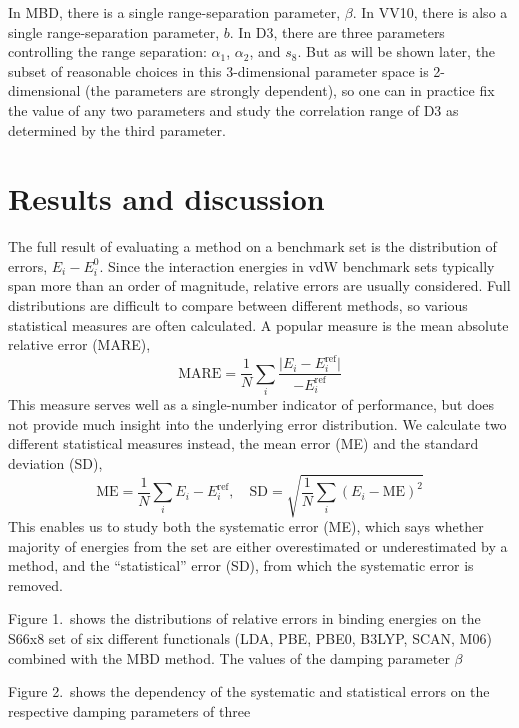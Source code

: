In MBD, there is a single range-separation parameter, $\beta$.
In VV10, there is also a single range-separation parameter, $b$.
In D3, there are three parameters controlling the range separation: $\alpha_1$, $\alpha_2$, and $s_8$.
But as will be shown later, the subset of reasonable choices in this 3-dimensional parameter space is 2-dimensional (the parameters are strongly dependent), so one can in practice fix the value of any two parameters and study the correlation range of D3 as determined by the third parameter.

\section{Results and discussion}

The full result of evaluating a method on a benchmark set is the distribution of errors, ${E_i-E_i^0}$.
Since the interaction energies in vdW benchmark sets typically span more than an order of magnitude, relative errors are usually considered.
Full distributions are difficult to compare between different methods, so various statistical measures are often calculated.
A popular measure is the mean absolute relative error (MARE),
$$
\text{MARE}=\frac1N\sum_i\frac{\lvert E_i-E_i^\text{ref}\rvert}{-E_i^\text{ref}}
$$
This measure serves well as a single-number indicator of performance, but does not provide much insight into the underlying error distribution.
We calculate two different statistical measures instead, the mean error (ME) and the standard deviation (SD),
$$
\text{ME}=\frac1N\sum_i E_i-E_i^\text{ref},\quad
\text{SD}=\sqrt{\frac1N\sum_i(E_i-\text{ME})^2}
$$
This enables us to study both the systematic error (ME), which says whether majority of energies from the set are either overestimated or underestimated by a method, and the ``statistical'' error (SD), from which the systematic error is removed.

Figure 1.\ shows the distributions of relative errors in binding energies on the S66x8 set of six different functionals (LDA, PBE, PBE0, B3LYP, SCAN, M06) combined with the MBD method.
The values of the damping parameter $\beta$ 

Figure 2.\ shows the dependency of the systematic and statistical errors on the respective damping parameters of three 

